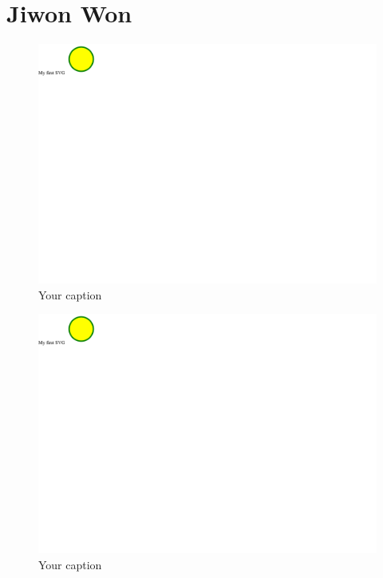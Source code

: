 \documentclass{article}
\begin{document}
\section{Jiwon Won}
\begin{figure}[h!]
    \centering
    \captionsetup{labelformat=empty}
    \caption{Your caption}
    \includegraphics[width=\textwidth, angle=0]{Kreis2.pdf}
\end{figure}
\newpage
\begin{figure}[h!]
    \centering
    \captionsetup{labelformat=empty}
    \caption{Your caption}
    \includegraphics[width=\textwidth, angle=0]{Kreis2.pdf}
\end{figure}
\newpage
\end{document}
